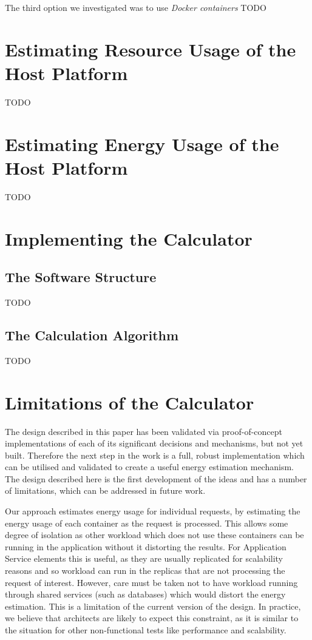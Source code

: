 The third option we investigated was to use \emph{Docker containers} TODO

\section{Estimating Resource Usage of the Host Platform}

TODO

\section{Estimating Energy Usage of the Host Platform}

TODO

\section{Implementing the Calculator}

\subsection{The Software Structure}

TODO

\subsection{The Calculation Algorithm}

TODO

\section{Limitations of the Calculator}

The design described in this paper has been validated via proof-of-concept implementations of each of its significant decisions and mechanisms, but not yet built.  Therefore the next step in the work is a full, robust implementation which can be utilised and validated to create a useful energy estimation mechanism.
The design described here is the first development of the ideas and has a number of limitations, which can be addressed in future work.

Our approach estimates energy usage for individual requests, by estimating the energy usage of each container as the request is processed.  This allows some degree of isolation as other workload which does not use these containers can be running in the application without it distorting the results.  For Application Service elements this is useful, as they are usually replicated for scalability reasons and so workload can run in the replicas that are not processing the request of interest.  However, care must be taken not to have workload running through shared services (such as databases) which would distort the energy estimation.  This is a limitation of the current version of the design. In practice, we believe that architects are likely to expect this constraint, as it is similar to the situation for other non-functional tests like performance and scalability.

